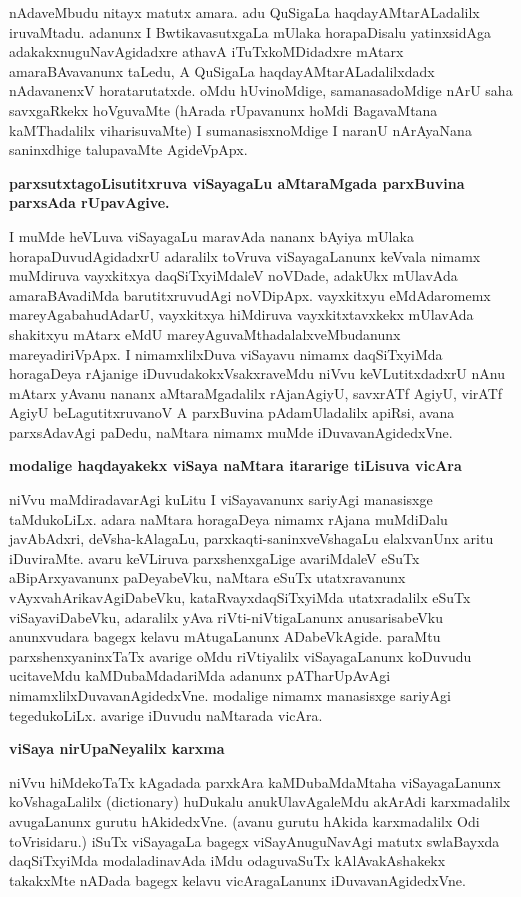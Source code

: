 nAdaveMbudu nitayx matutx amara. adu QuSigaLa haqdayAMtarALadalilx iruvaMtadu. adanunx I BwtikavasutxgaLa mUlaka horapaDisalu yatinxsidAga adakakxnuguNavAgidadxre athavA iTuTxkoMDidadxre mAtarx amaraBAvavanunx taLedu, A QuSigaLa haqdayAMtarALadalilxdadx nAdavanenxV horatarutatxde. oMdu hUvinoMdige, samanasadoMdige nArU saha savxgaRkekx hoVguvaMte (hArada rUpavanunx hoMdi BagavaMtana kaMThadalilx viharisuvaMte) I sumanasisxnoMdige I naranU nArAyaNana saninxdhige talupavaMte AgideVpApx.

\noindent
{\bf\large{parxsutxtagoLisutitxruva viSayagaLu aMtaraMgada parxBuvina parxsAda rUpavAgive.}}

I muMde heVLuva viSayagaLu maravAda nananx bAyiya mUlaka horapaDuvudAgidadxrU adaralilx toVruva viSayagaLanunx keVvala nimamx muMdiruva vayxkitxya daqSiTxyiMdaleV noVDade, adakUkx mUlavAda amaraBAvadiMda barutitxruvudAgi noVDipApx. vayxkitxyu eMdAdaromemx mareyAgabahudAdarU, vayxkitxya hiMdiruva vayxkitxtavxkekx mUlavAda shakitxyu mAtarx eMdU mareyAguvaMthadalalxveMbudanunx mareyadiriVpApx. I nimamxlilxDuva viSayavu nimamx daqSiTxyiMda horagaDeya rAjanige iDuvudakokxVsakxraveMdu niVvu keVLutitxdadxrU nAnu mAtarx yAvanu nananx aMtaraMgadalilx rAjanAgiyU, savxrATf AgiyU, virATf AgiyU beLagutitxruvanoV A parxBuvina pAdamUladalilx apiRsi, avana parxsAdavAgi paDedu, naMtara nimamx muMde iDuvavanAgidedxVne.

\noindent
{\bf\large{modalige haqdayakekx viSaya naMtara itararige tiLisuva vicAra}}\label{page131}

niVvu maMdiradavarAgi kuLitu I viSayavanunx sariyAgi manasisxge taMdukoLiLx. adara naMtara horagaDeya nimamx rAjana muMdiDalu javAbAdxri, deVsha-kAlagaLu, parxkaqti-saninxveVshagaLu elalxvanUnx aritu iDuviraMte. avaru keVLiruva parxshenxgaLige avariMdaleV eSuTx aBipArxyavanunx paDeyabeVku, naMtara eSuTx utatxravanunx vAyxvahArikavAgiDabeVku, kataRvayxdaqSiTxyiMda utatxradalilx eSuTx viSayaviDabeVku, adaralilx yAva riVti-niVtigaLanunx anusarisabeVku anunxvudara bagegx kelavu mAtugaLanunx ADabeVkAgide. paraMtu parxshenxyaninxTaTx avarige oMdu riVtiyalilx viSayagaLanunx koDuvudu ucitaveMdu kaMDubaMdadariMda adanunx pATharUpAvAgi nimamxlilxDuvavanAgidedxVne. modalige nimamx manasisxge sariyAgi tegedukoLiLx. avarige iDuvudu naMtarada vicAra.

\noindent
{\bf\large{viSaya nirUpaNeyalilx karxma}}

niVvu hiMdekoTaTx kAgadada parxkAra kaMDubaMdaMtaha viSayagaLanunx koVshagaLalilx ({\rm dictionary}) huDukalu anukUlavAgaleMdu akArAdi karxmadalilx avugaLanunx gurutu hAkidedxVne. (avanu gurutu hAkida karxmadalilx Odi toVrisidaru.) iSuTx viSayagaLa bagegx viSayAnuguNavAgi matutx swlaBayxda daqSiTxyiMda modaladinavAda iMdu odaguvaSuTx kAlAvakAshakekx takakxMte nADada bagegx kelavu vicAragaLanunx iDuvavanAgidedxVne.

